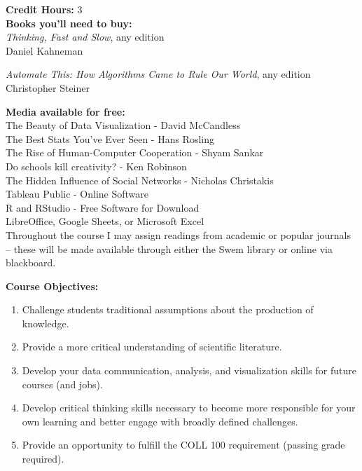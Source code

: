 \documentclass[11pt]{article}
\begin{document}
\textbf {Credit Hours:} 3 \\

\textbf {\large Books you'll need to buy:}\\ \emph{Thinking, Fast and Slow}, any edition \\
Daniel Kahneman 
\vspace{2mm}

\emph{Automate This: How Algorithms Came to Rule Our World}, any edition \\
Christopher Steiner
\vspace{2mm}

\textbf {\large Media available for free:}\\

The Beauty of Data Visualization - David McCandless \\
The Best Stats You’ve Ever Seen - Hans Rosling \\
The Rise of Human-Computer Cooperation - Shyam Sankar\\
Do schools kill creativity? - Ken Robinson \\
The Hidden Influence of Social Networks - Nicholas Christakis\\
Tableau Public - Online Software\\
R and RStudio - Free Software for Download\\
LibreOffice, Google Sheets, or Microsoft Excel\\

Throughout the course I may assign readings from academic or popular journals – these will be made available through either the Swem library or online via blackboard.

\vspace{8mm}

\textbf {\large Course Objectives:} 
\begin{enumerate} \itemsep-0.4em
  \item Challenge students traditional assumptions about the production of knowledge.
  \item Provide a more critical understanding of scientific literature.
  \item Develop your data communication, analysis, and visualization skills for future courses (and jobs).
  \item Develop critical thinking skills necessary to become more responsible for your own learning and better engage with broadly defined challenges.
  \item Provide an opportunity to fulfill the COLL 100 requirement (passing grade required).
\end{enumerate}
\vspace{8mm}
\end{document}
